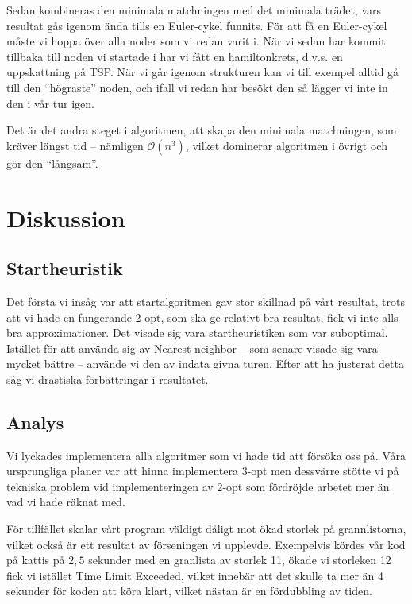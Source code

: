\documentclass[a4paper,12pt]{article}
\renewcommand{\O}{\ensuremath{\mathcal{O}}}
\renewcommand{\*}{\ensuremath{\cdot}}
\begin{document}
Sedan kombineras den minimala matchningen med det minimala trädet, vars resultat
gås igenom ända tills en Euler-cykel funnits. För att få en Euler-cykel måste vi
hoppa över alla noder som vi redan varit i. När vi sedan har kommit tillbaka
till noden vi startade i har vi fått en hamiltonkrets, d.v.s. en uppskattning på
TSP.  När vi går igenom strukturen kan vi till exempel alltid gå till den
``högraste'' noden, och ifall vi redan har besökt den så lägger vi inte in den i
vår tur igen.

Det är det andra steget i algoritmen, att skapa den minimala matchningen, som
kräver längst tid -- nämligen $\O(n^3)$, vilket dominerar algoritmen i övrigt och
gör den ``långsam''.



\section{Diskussion}

\subsection{Startheuristik}

Det första vi insåg var att startalgoritmen gav stor skillnad på vårt resultat,
trots att vi hade en fungerande 2-opt, som ska ge relativt bra resultat, fick vi
inte alls bra approximationer. Det visade sig vara startheuristiken som var
suboptimal. Istället för att använda sig av Nearest neighbor -- som senare
visade sig vara mycket bättre -- använde vi den av indata givna turen. Efter att
ha justerat detta såg vi drastiska förbättringar i resultatet.

\subsection{Analys}

Vi lyckades implementera alla algoritmer som vi hade tid att försöka oss på.
Våra ursprungliga planer var att hinna implementera 3-opt men dessvärre stötte
vi på tekniska problem vid implementeringen av 2-opt som fördröjde arbetet mer
än vad vi hade räknat med.

För tillfället skalar vårt program väldigt dåligt mot ökad storlek på
grannlistorna, vilket också är ett resultat av förseningen vi upplevde.
Exempelvis kördes vår kod på kattis på $2,5$ sekunder med  en granlista av
storlek 11, ökade vi storleken 12 fick vi istället Time Limit Exceeded, vilket
innebär att det skulle ta mer än 4 sekunder för koden att köra klart, vilket
nästan är en fördubbling av tiden.
\end{document}
